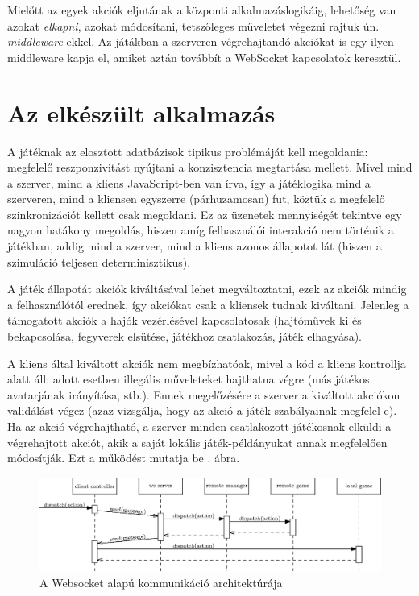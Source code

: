 \documentclass[12pt]{article}
\begin{document}
Mielőtt az egyek akciók eljutának a központi alkalmazáslogikáig, lehetőség van
azokat \emph{elkapni}, azokat módosítani, tetszőleges műveletet végezni rajtuk ún. \emph{middleware}-ekkel.
Az játákban a szerveren végrehajtandó akciókat is egy ilyen middleware kapja el,
amiket aztán továbbít a WebSocket kapcsolatok keresztül.

\section{Az elkészült alkalmazás}

A játéknak az elosztott adatbázisok tipikus problémáját kell megoldania:
megfelelő reszponzivitást nyújtani a konzisztencia megtartása mellett.
Mivel mind a szerver, mind a kliens JavaScript-ben van írva, így a játéklogika
mind a szerveren, mind a kliensen egyszerre (párhuzamosan) fut,
köztük a megfelelő szinkronizációt kellett csak megoldani.
Ez az üzenetek mennyiségét tekintve egy nagyon hatákony megoldás, hiszen amíg
felhasználói interakció nem történik a játékban, addig mind a szerver, mind a
kliens azonos állapotot lát (hiszen a szimuláció teljesen determinisztikus).

A játék állapotát akciók kiváltásával lehet megváltoztatni, ezek az akciók
mindig a felhasználótól erednek, így akciókat csak a kliensek tudnak kiváltani.
Jelenleg a támogatott akciók a hajók vezérlésével kapcsolatosak (hajtóművek ki
és bekapcsolása, fegyverek elsütése, játékhoz csatlakozás, játék elhagyása).

A kliens által kiváltott akciók nem megbízhatóak, mivel a kód a kliens kontrollja alatt áll:
adott esetben illegális műveleteket hajthatna végre (más játékos avatarjának irányítása, stb.).
Ennek megelőzésére a szerver a kiváltott akciókon validálást végez (azaz vizsgálja,
hogy az akció a játék szabályainak megfelel-e).
Ha az akció végrehajtható, a szerver minden csatlakozott játékosnak elküldi
a végrehajtott akciót, akik a saját lokális játék-példányukat annak megfelelően módosítják.
Ezt a működést mutatja be . ábra.

\begin{figure}[h!]
  \centering
  \includegraphics[width=\textwidth]{figures/ws}
  \caption{A Websocket alapú kommunikáció architektúrája}
  \label{fig:ws-arch}
\end{figure}
\end{document}
